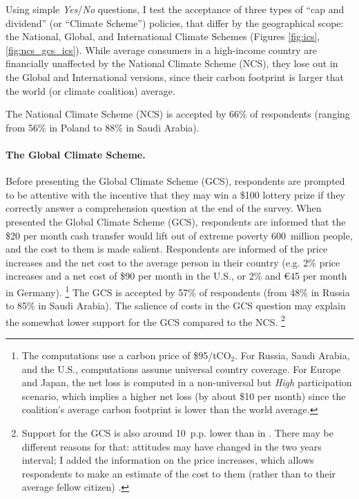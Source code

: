 \documentclass[12pt,english]{article}
\begin{document}
\begin{bibunit}
Using simple \textit{Yes}/\textit{No} questions, I test the acceptance of three types of ``cap and dividend'' (or ``Climate Scheme'') policies, that differ by the geographical scope: the National, Global, and International Climate Schemes (Figures \ref{fig:ics}, \ref{fig:ncs_gcs_ics}). While average consumers in a high-income country are financially unaffected by the National Climate Scheme (NCS), they lose out in the Global and International versions, since their carbon footprint is larger that the world (or climate coalition) average. 

The National Climate Scheme (NCS) is accepted by 66\% of respondents (ranging from 56\% in Poland to 88\% in Saudi Arabia). 

\paragraph{The Global Climate Scheme.} Before presenting the Global Climate Scheme (GCS), respondents are prompted to be attentive with the incentive that they may win a \$100 lottery prize if they correctly answer a comprehension question at the end of the survey. 
When presented the Global Climate Scheme (GCS), respondents are informed that the \$20 per month cash transfer would lift out of extreme poverty 600~million people, and the cost to them is made salient. Respondents are informed of the price increases and the net cost to the average person in their country (e.g. 2\% price increases and a net cost of \$90 per month in the U.S., or 2\% and \euro{}45 per month in Germany).%
\footnote{The computations use a carbon price of \$95/tCO$_\text{2}$. For Russia, Saudi Arabia, and the U.S., computations assume universal country coverage. 
For Europe and Japan, the net loss is computed in a non-universal but \textit{High} participation scenario, which implies a higher net loss (by about \$10 per month) since the coalition's average carbon footprint is lower than the world average.} 
The GCS is accepted by 57\% of respondents (from 48\% in Russia to 85\% in Saudi Arabia). The salience of costs in the GCS question may explain the somewhat lower support for the GCS compared to the NCS.%
\footnote{Support for the GCS is also around 10~p.p. lower than in \citep{fabre_majority_2025}. There may be different reasons for that: attitudes may have changed in the two years interval; I added the information on the price increases, which allows respondents to make an estimate of the cost to them (rather than to their average fellow citizen)%
.} 


\end{bibunit}
\end{document}
